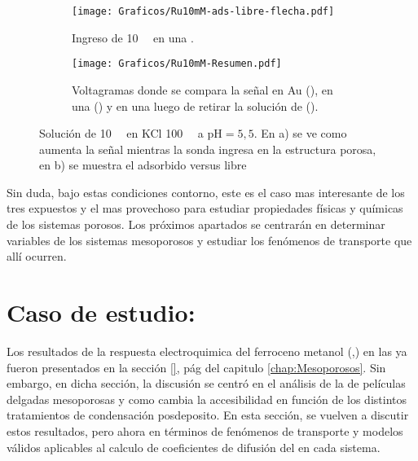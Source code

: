 			\begin{figure}[ht!]
				\begin{subfigure}[t]{0.495\textwidth}
				\texttt{[image: Graficos/Ru10mM-ads-libre-flecha.pdf]}
		        \caption{Ingreso de \ru\space \SI{10}{\milli\Molar} en una \pdmF.}
		        \label{fig:Ru10mM_ingreso}
		      	\end{subfigure}
		      	\begin{subfigure}[t]{0.495\textwidth}
				\texttt{[image: Graficos/Ru10mM-Resumen.pdf]}
		        \caption{Voltagramas donde se compara la señal en Au (\usebox{\rojo}), en una \pdmF\space(\usebox{\verde}) y en una \pdmF\space luego de retirar la solución de \ru (\usebox{\azul}).}
		        \label{fig:Ru10mM-resumen}
		      	\end{subfigure}
		      	\caption[Adsorción de sonda positiva en \pdm]{Solución de \ru\space \SI{10}{\milli\Molar} en KCl \SI{100}{\milli\Molar} a $\text{pH}=5,5$. En a) se ve como aumenta la señal mientras la sonda ingresa en la estructura porosa, en b) se muestra el adsorbido versus libre}
		      	\label{fig:primero-Ru10mM}
		      	\end{figure}


		Sin duda, bajo estas condiciones contorno, este es el caso mas interesante de los tres expuestos y el mas provechoso para estudiar propiedades físicas y químicas de los sistemas porosos. Los próximos apartados se centrarán en determinar variables de los sistemas mesoporosos y estudiar los fenómenos de transporte que allí ocurren.

\section{Caso de estudio: \texorpdfstring{\ferroceno}{FeOH}}\label{sec:difusion}

	 Los resultados de la respuesta electroquimica del ferroceno metanol \linebreak (\ferroceno,\fc) en las \pdmF\space ya fueron presentados en la sección \ref{}, pág \pageref{key} del capitulo \ref{chap:Mesoporosos}. Sin embargo, en dicha sección, la discusión se centró en el análisis de la de películas delgadas mesoporosas y como cambia la accesibilidad en función de los distintos tratamientos de condensación posdeposito.
	 En esta sección, se vuelven a discutir estos resultados, pero ahora en términos de fenómenos de transporte y modelos válidos aplicables al calculo de coeficientes de difusión del \fc\space en cada sistema.

